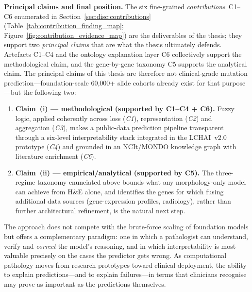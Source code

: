 \textbf{Principal claims and final position.}
The six fine-grained \emph{contributions}~C1--C6 enumerated in
Section~\ref{sec:disc:contributions}
(Table~\ref{tab:contribution_finding_map};
Figure~\ref{fig:contribution_evidence_map}) are the
deliverables of the thesis; they support two
\emph{principal claims} that are what the thesis ultimately
defends.
Artefacts C1--C4 and the ontology explanation layer C6
collectively support the methodological claim, and the
gene-by-gene taxonomy C5 supports the analytical claim.
The principal claims of this thesis are therefore not
clinical-grade mutation prediction---foundation-scale 60{,}000+
slide cohorts already exist for that purpose---but the
following two:
\begin{enumerate}
    \item \textbf{Claim~(i) --- methodological
    (supported by C1--C4 + C6).}
    Fuzzy logic, applied coherently across loss
    (\emph{C1}), representation (\emph{C2}) and aggregation
    (\emph{C3}), makes a public-data prediction pipeline
    transparent through a six-level interpretability stack
    integrated in the LCHAI~v2.0 prototype (\emph{C4}) and
    grounded in an NCIt/MONDO knowledge graph with literature
    enrichment (\emph{C6}).
    \item \textbf{Claim~(ii) --- empirical/analytical
    (supported by C5).}
    The three-regime taxonomy enunciated above bounds what any
    morphology-only model can achieve from H\&E alone, and
    identifies the genes for which fusing additional data
    sources (gene-expression profiles, radiology), rather than
    further architectural refinement, is the natural next step.
\end{enumerate}
The approach does not compete with the brute-force scaling of
foundation models but offers a complementary paradigm: one in
which a pathologist can understand, verify and \emph{correct} the
model's reasoning, and in which interpretability is most valuable
precisely on the cases the predictor gets wrong.
As computational pathology moves from research prototypes toward
clinical deployment, the ability to explain predictions---and to
explain failures---in terms that clinicians recognise may prove
as important as the predictions themselves.